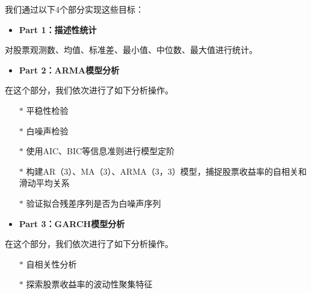 \documentclass[12pt]{article}
\begin{document}
我们通过以下4个部分实现这些目标：

\begin{itemize}
    \item \textbf{Part 1：描述性统计}
\end{itemize}

对股票观测数、均值、标准差、最小值、中位数、最大值进行统计。


\begin{itemize}
    \item \textbf{Part 2：ARMA模型分析}
\end{itemize}

在这个部分，我们依次进行了如下分析操作。

\begin{itemize}
    \item[$\ast$] 平稳性检验
\end{itemize}

\begin{itemize}
    \item[$\ast$] 白噪声检验
\end{itemize}

\begin{itemize}
    \item[$\ast$] 使用AIC、BIC等信息准则进行模型定阶
\end{itemize}

\begin{itemize}
    \item[$\ast$] 构建AR（3）、MA（3）、ARMA（3，3）模型，捕捉股票收益率的自相关和滑动平均关系
\end{itemize}

\begin{itemize}
    \item[$\ast$] 验证拟合残差序列是否为白噪声序列
\end{itemize}

\begin{itemize}
    \item \textbf{Part 3：GARCH模型分析}
\end{itemize}


在这个部分，我们依次进行了如下分析操作。

\begin{itemize}
    \item[$\ast$] 自相关性分析
\end{itemize}

\begin{itemize}
    \item[$\ast$] 探索股票收益率的波动性聚集特征
\end{itemize}
\end{document}
